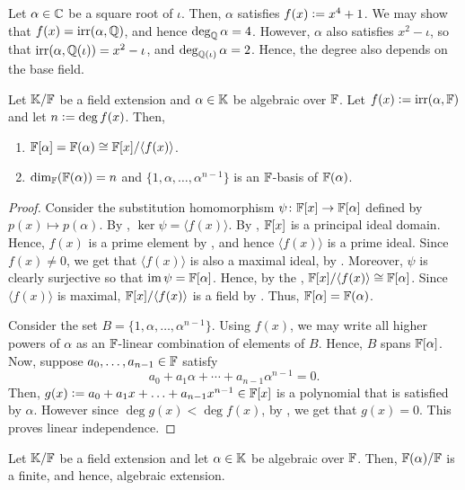 \begin{ex}
    Let $\alpha \in \mathbb{C}$ be a square root of $\iota$. Then, $\alpha$ satisfies $f(x) \vcentcolon= x^4 + 1$. We may show that $f(x) = \operatorname{irr}(\alpha, \mathbb{Q})$, and hence $\deg_{\mathbb{Q}}\alpha = 4$. However, $\alpha$ also satisfies $x^2 - \iota$, so that $\operatorname{irr}(\alpha, \mathbb{Q}(\iota)) = x^2 - \iota$, and $\deg_{\mathbb{Q}(\iota)}\alpha = 2$. Hence, the degree also depends on the base field.
\end{ex}

\begin{prop}
    Let $\mathbb{K}/\mathbb{F}$ be a field extension and $\alpha \in \mathbb{K}$ be algebraic over $\mathbb{F}$. Let $f(x) \vcentcolon= \operatorname{irr}(\alpha, \mathbb{F})$ and let $n \vcentcolon= \deg f(x)$. Then, 
    \begin{enumerate}
        \item $\mathbb{F}[\alpha] = \mathbb{F}(\alpha) \cong \mathbb{F}[x]/\langle f(x) \rangle$.
        \item $\dim_{\mathbb{F}}(\mathbb{F}(\alpha)) = n$ and $\{1, \alpha, \ldots, \alpha^{n-1}\}$ is an $\mathbb{F}$-basis of $\mathbb{F}(\alpha)$.
    \end{enumerate}
\end{prop}
\begin{proof}
    Consider the substitution homomorphism $\psi \colon \mathbb{F}[x] \to \mathbb{F}[\alpha]$ defined by $p(x) \mapsto p(\alpha)$. By , $\ker\psi = \langle f(x) \rangle$. By , $\mathbb{F}[x]$ is a principal ideal domain. Hence, $f(x)$ is a prime element by , and hence $\langle f(x) \rangle$ is a prime ideal. Since $f(x) \neq 0$, we get that $\langle f(x) \rangle$ is also a maximal ideal, by . Moreover, $\psi$ is clearly surjective so that $\operatorname{im}\psi = \mathbb{F}[\alpha]$. Hence, by the , $\mathbb{F}[x]/\langle f(x) \rangle \cong \mathbb{F}[\alpha]$. Since $\langle f(x) \rangle$ is maximal, $\mathbb{F}[x]/\langle f(x) \rangle$ is a field by . Thus, $\mathbb{F}[\alpha] = \mathbb{F}(\alpha)$.
    
    Consider the set $B = \{1, \alpha, \ldots, \alpha^{n-1}\}$. Using $f(x)$, we may write all higher powers of $\alpha$ as an $\mathbb{F}$-linear combination of elements of $B$. Hence, $B$ spans $\mathbb{F}[\alpha]$. Now, suppose $a_0, \ldots, a_{n-1} \in \mathbb{F}$ satisfy
    \[
        a_0 + a_1 \alpha + \cdots + a_{n-1} \alpha^{n-1} = 0.
    \]
    Then, $g(x) \vcentcolon= a_0 + a_1 x + \ldots + a_{n-1} x^{n-1} \in \mathbb{F}[x]$ is a polynomial that is satisfied by $\alpha$. However since $\deg g(x) < \deg f(x)$, by , we get that $g(x) = 0$. This proves linear independence.
\end{proof}
\begin{cor}
    Let $\mathbb{K}/\mathbb{F}$ be a field extension and let $\alpha \in \mathbb{K}$ be algebraic over $\mathbb{F}$. Then, $\mathbb{F}(\alpha)/\mathbb{F}$ is a finite, and hence, algebraic extension.
\end{cor}

